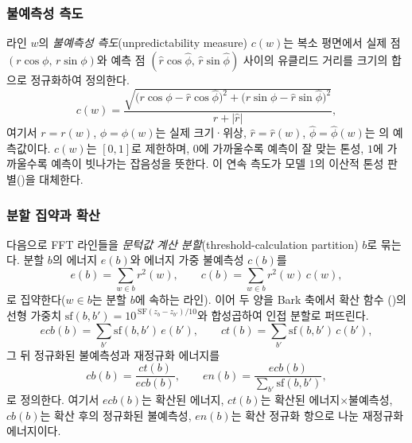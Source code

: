 \documentclass[11pt,a4paper]{article}
\begin{document}
\subsubsection{불예측성 측도}
라인 $w$의 \emph{불예측성 측도}(unpredictability measure) $c(w)$는 복소 평면에서
실제 점 $(r\cos\phi,\, r\sin\phi)$와 예측 점 $(\hat r\cos\hat\phi,\, \hat r\sin\hat\phi)$
사이의 유클리드 거리를 크기의 합으로 정규화하여 정의한다.
\begin{equation}\label{eq:pam2unpred}
  c(w) = \frac{\sqrt{\bigl(r\cos\phi - \hat r\cos\hat\phi\bigr)^{2}
                    + \bigl(r\sin\phi - \hat r\sin\hat\phi\bigr)^{2}}}
              {r + \lvert\hat r\rvert},
\end{equation}
여기서 $r=r(w)$, $\phi=\phi(w)$는 실제 크기·위상, $\hat r=\hat r(w)$,
$\hat\phi=\hat\phi(w)$는 의 예측값이다. $c(w)$는 $[0,1]$로
제한하며, $0$에 가까울수록 예측이 잘 맞는 톤성, $1$에 가까울수록 예측이 빗나가는
잡음성을 뜻한다. 이 연속 측도가 모델 1의 이산적 톤성 판별()을
대체한다.

\subsubsection{분할 집약과 확산}
다음으로 FFT 라인들을 \emph{문턱값 계산 분할}(threshold-calculation partition) $b$로
묶는다. 분할 $b$의 에너지 $e(b)$와 에너지 가중 불예측성 $c(b)$를
\begin{equation}\label{eq:pam2part}
  e(b) = \sum_{w \in b} r^{2}(w),
  \qquad
  c(b) = \sum_{w \in b} r^{2}(w)\,c(w),
\end{equation}
로 집약한다($w \in b$는 분할 $b$에 속하는 라인). 이어 두 양을 Bark 축에서 확산 함수
()의 선형 가중치 $\mathrm{sf}(b,b') = 10^{\,\mathrm{SF}(z_{b}-z_{b'})/10}$와
합성곱하여 인접 분할로 퍼뜨린다.
\begin{equation}\label{eq:pam2spread}
  \mathit{ecb}(b) = \sum_{b'} \mathrm{sf}(b,b')\,e(b'),
  \qquad
  \mathit{ct}(b)  = \sum_{b'} \mathrm{sf}(b,b')\,c(b'),
\end{equation}
그 뒤 정규화된 불예측성과 재정규화 에너지를
\begin{equation}\label{eq:pam2cb}
  \mathit{cb}(b) = \frac{\mathit{ct}(b)}{\mathit{ecb}(b)},
  \qquad
  \mathit{en}(b) = \frac{\mathit{ecb}(b)}{\sum_{b'} \mathrm{sf}(b,b')},
\end{equation}
로 정의한다. 여기서 $\mathit{ecb}(b)$는 확산된 에너지, $\mathit{ct}(b)$는 확산된
에너지$\times$불예측성, $\mathit{cb}(b)$는 확산 후의 정규화된 불예측성,
$\mathit{en}(b)$는 확산 정규화 항으로 나눈 재정규화 에너지이다.
\end{document}

